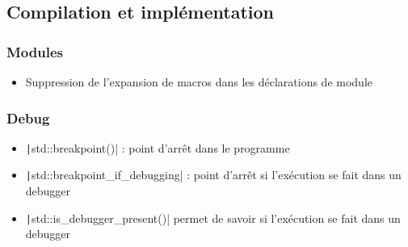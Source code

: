 \documentclass[C++.tex]{subfiles}
\begin{document}
\subsection*{Compilation et implémentation}
\begin{frame}[fragile]
	\frametitle{Modules}
	\begin{itemize}
		\item Suppression de l'expansion de macros dans les déclarations de module
	\end{itemize}

\end{frame}

\begin{frame}[fragile]
	\frametitle{Debug}
	\begin{itemize}
		\item \texttt|std::breakpoint()| : point d'arrêt dans le programme
		\item \texttt|std::breakpoint_if_debugging| : point d'arrêt si l'exécution se fait dans un debugger
		\item \texttt|std::is_debugger_present()| permet de savoir si l'exécution se fait dans un debugger
	\end{itemize}

\end{frame}
\end{document}
